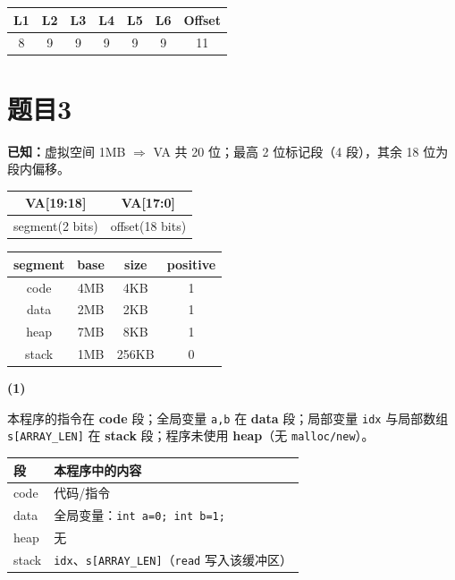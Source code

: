 \documentclass[fleqn]{ctexart}
\begin{document}
\vspace{2mm}
\begin{center}
\begin{tabular}{|c|c|c|c|c|c|c|}
\hline
\textbf{L1} & \textbf{L2} & \textbf{L3} & \textbf{L4} & \textbf{L5} & \textbf{L6} & \textbf{Offset} \\
\hline
8 & 9 & 9 & 9 & 9 & 9 & 11 \\
\hline
\end{tabular}
\end{center}

\section*{题目3}

\noindent\textbf{已知：}虚拟空间 1MB $\Rightarrow$ VA 共 20 位；最高 2 位标记段（4 段），其余 18 位为段内偏移。

\vspace{1mm}
\begin{center}
\begin{tabular}{|c|c|}
\hline
\textbf{VA[19:18]} & \textbf{VA[17:0]} \\
\hline
segment(2 bits) & offset(18 bits) \\
\hline
\end{tabular}
\end{center}

\vspace{1mm}
\begin{center}
\begin{tabular}{|c|c|c|c|}
\hline
\textbf{segment} & \textbf{base} & \textbf{size} & \textbf{positive} \\
\hline
code  & 4MB & 4KB   & 1 \\
\hline
data  & 2MB & 2KB   & 1 \\
\hline
heap  & 7MB & 8KB   & 1 \\
\hline
stack & 1MB & 256KB & 0 \\
\hline
\end{tabular}
\end{center}

\noindent\textbf{(1)}

\noindent 本程序的指令在 \textbf{code} 段；全局变量 \texttt{a,b} 在 \textbf{data} 段；局部变量 \texttt{idx} 与局部数组 \texttt{s[ARRAY\_LEN]} 在 \textbf{stack} 段；程序未使用 \textbf{heap}（无 \texttt{malloc/new}）。

\vspace{1mm}
\begin{center}
\begin{tabular}{|p{}|p{}|}
\hline
\textbf{段} & \textbf{本程序中的内容} \\
\hline
code  & 代码/指令 \\
\hline
data  & 全局变量：\texttt{int a=0; int b=1;} \\
\hline
heap  & 无 \\
\hline
stack & \texttt{idx}、\texttt{s[ARRAY\_LEN]}（\texttt{read} 写入该缓冲区） \\
\hline
\end{tabular}
\end{center}
\end{document}
